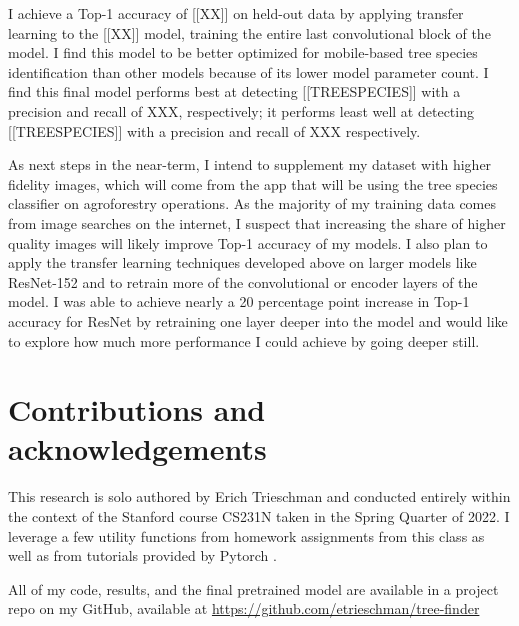 \documentclass[10pt,twocolumn,letterpaper]{article}
\begin{document}
I achieve a Top-1 accuracy of [[XX]] on held-out data by applying transfer learning to the [[XX]] model, training the entire last convolutional block of the model. I find this model to be better optimized for mobile-based tree species identification than other models because of its lower model parameter count. I find this final model performs best at detecting [[TREESPECIES]] with a precision and recall of XXX, respectively; it performs least well at detecting [[TREESPECIES]] with a precision and recall of XXX respectively.

As next steps in the near-term, I intend to supplement my dataset with higher fidelity images, which will come from the app that will be using the tree species classifier on agroforestry operations. As the majority of my training data comes from image searches on the internet, I suspect that increasing the share of higher quality images will likely improve Top-1 accuracy of my models. I also plan to apply the transfer learning techniques developed above on larger models like ResNet-152 and to retrain more of the convolutional or encoder layers of the model. I was able to achieve nearly a 20 percentage point increase in Top-1 accuracy for ResNet by retraining one layer deeper into the model and would like to explore how much more performance I could achieve by going deeper still. 


\section{Contributions and acknowledgements}
\label{sec:contrib}
This research is solo authored by Erich Trieschman and conducted entirely within the context of the Stanford course CS231N taken in the Spring Quarter of 2022. I leverage a few utility functions from homework assignments from this class as well as from tutorials provided by Pytorch \cite{PyTorch}.

All of my code, results, and the final pretrained model are available in a project repo on my GitHub, available at \url{https://github.com/etrieschman/tree-finder}

{\small


}
\end{document}
